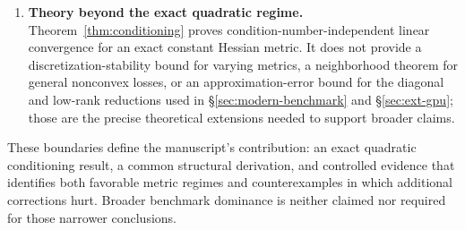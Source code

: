 \documentclass[10pt,twocolumn]{article}
\begin{document}
\begin{enumerate}
pretraining, multiple WikiText/OpenWebText-scale runs, or multiple
independent quantum systems and dimensions are included (Limitation 7);
\S\ref{sec:ext-quantum}'s single kicked-top configuration and
\S\ref{sec:experimental-validation}'s single 200-step WikiText-2 run are
illustrative, not comprehensive.
\item \textbf{Theory beyond the exact quadratic regime.}
Theorem~\ref{thm:conditioning} proves condition-number-independent linear
convergence for an exact constant Hessian metric. It does not provide a
discretization-stability bound for varying metrics, a neighborhood theorem
for general nonconvex losses, or an approximation-error bound for the
diagonal and low-rank reductions used in \S\ref{sec:modern-benchmark} and
\S\ref{sec:ext-gpu}; those are the precise theoretical extensions needed to
support broader claims.
\end{enumerate}

These boundaries define the manuscript's contribution: an exact quadratic
conditioning result, a common structural derivation, and controlled evidence
that identifies both favorable metric regimes and counterexamples in which
additional corrections hurt. Broader benchmark dominance is neither claimed
nor required for those narrower conclusions.
\end{document}
